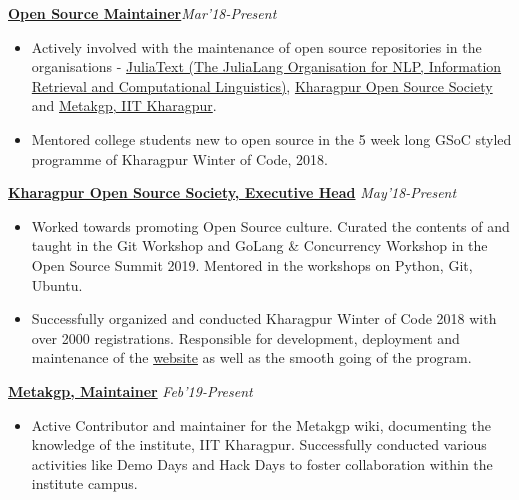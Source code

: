 \documentclass[a4paper,10pt]{extarticle} %
\begin{document}
\textbf{\href{https://github.com/Ayushk4}{Open Source Maintainer}}\hfill\textit{\small{Mar'18-Present}}
    \begin{itemize}[leftmargin=.15in]
        \item Actively involved with the maintenance of open source repositories in the organisations -  \href{https://github.com/JuliaText}{JuliaText (The JuliaLang Organisation for NLP, Information Retrieval and Computational Linguistics)}, \href{https://github.com/kossiitkgp}{Kharagpur Open Source Society} and \href{https://github.com/metakgp}{Metakgp, IIT Kharagpur}. 
        \item Mentored college students new to open source in the 5 week long GSoC styled programme of Kharagpur Winter of Code, 2018.
    \end{itemize}

\textbf{\href{https://kossiitkgp.in/}{Kharagpur Open Source Society, Executive Head}}     \hfill\textit{\small{May'18-Present}}
    \begin{itemize}[leftmargin=.15in]
        \item Worked towards promoting Open Source culture. Curated the contents of and taught in the Git Workshop and GoLang \& Concurrency Workshop in the Open Source Summit 2019. Mentored in the workshops on Python, Git, Ubuntu.
        \item Successfully organized and conducted Kharagpur Winter of Code 2018 with over 2000 registrations. Responsible for development, deployment and maintenance of the \href{https://github.com/kossiitkgp/kwoc-2018}{website} as well as the smooth going of the program.
    \end{itemize}


\textbf{\href{https://wiki.metakgp.org}{Metakgp, Maintainer}} \hfill\textit{\small{Feb'19-Present}}
    \begin{itemize}[leftmargin=.15in]
        \item Active Contributor and maintainer for the Metakgp wiki, documenting the knowledge of the institute, IIT Kharagpur. Successfully conducted various activities like Demo Days and Hack Days to foster collaboration within the institute campus. \\
    \end{itemize}
\end{document}
